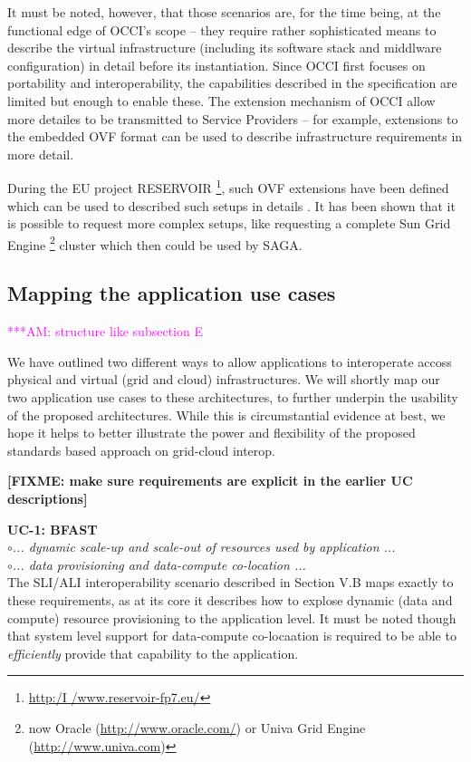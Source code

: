 \documentclass[10pt,conference,final,letterpaper,twoside,twocolumn,]{IEEEtran}
\newcommand{\amnote}[1]{  {\textcolor{magenta} {***AM: #1}}}
\newcommand{\amnote}[1]{}
\newcommand{\I}[1]{\textit{#1}}
\newcommand{\B}[1]{\textbf{#1}}
\newcommand{\F}[1]{\B{[FIXME: #1]}}
\newcommand{\bull}{$\circ$}
\begin{document}
 It must be noted, however, that those scenarios are, for the time
 being, at the functional edge of OCCI's scope -- they require rather
 sophisticated means to describe the virtual infrastructure (including
 its software stack and middlware configuration) in detail before
 its instantiation. Since OCCI first focuses on portability and
 interoperability, the capabilities described in the specification are
 limited but enough to enable these. The extension mechanism of OCCI
 allow more detailes to be transmitted to Service Providers -- for
 example, extensions to the embedded OVF format can be used to
 describe infrastructure requirements in more detail.

 During the EU project RESERVOIR
 \footnote{\url{http:/I /www.reservoir-fp7.eu/}}, such OVF extensions
 have been defined which can be used to described such setups in
 details \cite{comsware09}.  It has been shown that it is possible to
 request more complex setups, like requesting a complete Sun Grid
 Engine \footnote{now Oracle (\url{http://www.oracle.com/}) or Univa
 Grid Engine (\url{http://www.univa.com})} cluster which then could be
 used by SAGA.


 \subsection{Mapping the application use cases}

 \amnote{structure like subsection E}

 We have outlined two different ways to allow applications to
 interoperate accoss physical and virtual (grid and cloud)
 infrastructures.  We will shortly map our two application use cases
 to these architectures, to further underpin the usability of the
 proposed architectures.  While this is circumstantial evidence at
 best, we hope it helps to better illustrate the power and flexibility
 of the proposed standards based approach on grid-cloud interop.

 \F{make sure requirements are explicit in the earlier UC
 descriptions}

 \noindent
 \B{UC-1: BFAST}\\
 \bull \I{... dynamic scale-up and scale-out of resources used by
 application ...}\\
 \bull \I{... data provisioning and data-compute co-location ...}\\
 The SLI/ALI interoperability scenario described in Section V.B maps
 exactly to these requirements, as at its core it describes how to
 explose dynamic (data and compute) resource provisioning to the
 application level.  It must be noted though that system level support
 for data-compute co-locaation is required to be able to
 \I{efficiently} provide that capability to the application.
\end{document}
